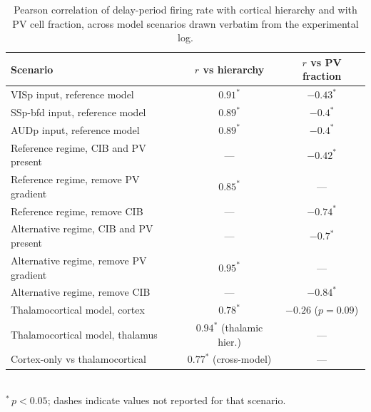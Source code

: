 \documentclass[11pt]{article}
\begin{document}
\begin{table}[htbp]
\centering
\caption{Pearson correlation of delay-period firing rate with cortical hierarchy and with PV cell fraction, across model scenarios drawn verbatim from the experimental log.}
\label{tab:correlations}
\begin{tabular}{lcc}
\toprule
Scenario & $r$ vs hierarchy & $r$ vs PV fraction \\
\midrule
VISp input, reference model & $0.91^{*}$ & $-0.43^{*}$ \\
SSp-bfd input, reference model & $0.89^{*}$ & $-0.4^{*}$ \\
AUDp input, reference model & $0.89^{*}$ & $-0.4^{*}$ \\
Reference regime, CIB and PV present & --- & $-0.42^{*}$ \\
Reference regime, remove PV gradient & $0.85^{*}$ & --- \\
Reference regime, remove CIB & --- & $-0.74^{*}$ \\
Alternative regime, CIB and PV present & --- & $-0.7^{*}$ \\
Alternative regime, remove PV gradient & $0.95^{*}$ & --- \\
Alternative regime, remove CIB & --- & $-0.84^{*}$ \\
Thalamocortical model, cortex & $0.78^{*}$ & $-0.26$ ($p=0.09$) \\
Thalamocortical model, thalamus & $0.94^{*}$ (thalamic hier.) & --- \\
Cortex-only vs thalamocortical & $0.77^{*}$ (cross-model) & --- \\
\bottomrule
\end{tabular}
\\[0.3em]
\small{$^{*}\,p<0.05$; dashes indicate values not reported for that scenario.}
\end{table}
\end{document}
